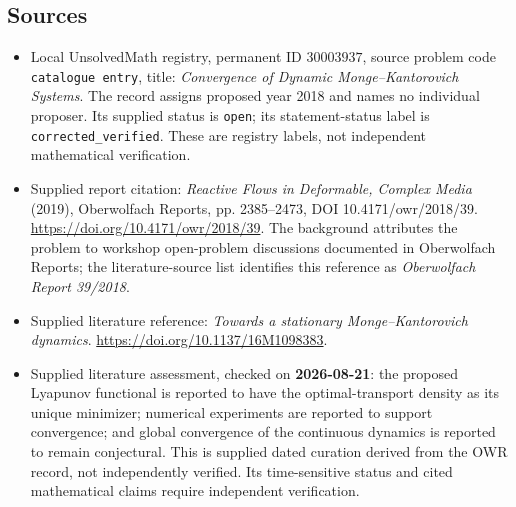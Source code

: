 \documentclass[11pt]{article}
\begin{document}
\subsection{Sources}
\begin{itemize}
\item Local UnsolvedMath registry, permanent ID \(30003937\), source problem code \texttt{catalogue entry}, title: \emph{Convergence of Dynamic Monge--Kantorovich Systems}. The record assigns proposed year 2018 and names no individual proposer. Its supplied status is \texttt{open}; its statement-status label is \texttt{corrected\_verified}. These are registry labels, not independent mathematical verification.
\item Supplied report citation: \emph{Reactive Flows in Deformable, Complex Media} (2019), Oberwolfach Reports, pp. 2385--2473, DOI 10.4171/owr/2018/39. \url{https://doi.org/10.4171/owr/2018/39}. The background attributes the problem to workshop open-problem discussions documented in Oberwolfach Reports; the literature-source list identifies this reference as \emph{Oberwolfach Report 39/2018}.
\item Supplied literature reference: \emph{Towards a stationary Monge--Kantorovich dynamics}. \url{https://doi.org/10.1137/16M1098383}.
\item Supplied literature assessment, checked on \textbf{2026-08-21}: the proposed Lyapunov functional is reported to have the optimal-transport density as its unique minimizer; numerical experiments are reported to support convergence; and global convergence of the continuous dynamics is reported to remain conjectural. This is supplied dated curation derived from the OWR record, not independently verified. Its time-sensitive status and cited mathematical claims require independent verification.
\end{itemize}
\end{document}
